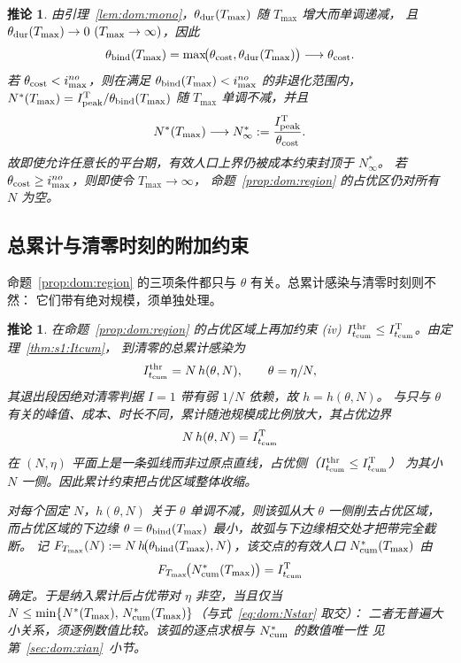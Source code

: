 \documentclass[lang=cn,a4paper,newtx]{elegantpaper}
\numberwithin{equation}{section}
\theoremstyle{plain}
\newtheorem{corollaryn}[theorem]{推论}
\newcommand{\Itcum}{I_{t_{\mathrm{cum}}}}
\begin{document}
\begin{corollaryn}\label{cor:ceiling}
由引理~\ref{lem:dom:mono}，$\theta_{\rm dur}(T_{\max})$ 随 $T_{\max}$ 增大而单调递减，
且 $\theta_{\rm dur}(T_{\max})\to0\ (T_{\max}\to\infty)$，因此
\[
  \theta_{\rm bind}(T_{\max})
  =
  \max\!\bigl(
    \theta_{\rm cost},
    \theta_{\rm dur}(T_{\max})
  \bigr)
  \longrightarrow
  \theta_{\rm cost}.
\]
若 $\theta_{\rm cost}<i_{\max}^{no}$，则在满足 $\theta_{\rm bind}(T_{\max})<i_{\max}^{no}$
的非退化范围内，$N^\ast(T_{\max})=I_{\rm peak}^{\rm T}/\theta_{\rm bind}(T_{\max})$
随 $T_{\max}$ 单调不减，并且
\[
  N^\ast(T_{\max})
  \longrightarrow
  N^\ast_\infty
  :=
  \frac{I_{\rm peak}^{\rm T}}
       {\theta_{\rm cost}}.
\]
故即使允许任意长的平台期，有效人口上界仍被成本约束封顶于 $N^\ast_\infty$。
若 $\theta_{\rm cost}\ge i_{\max}^{no}$，则即使令 $T_{\max}\to\infty$，
命题~\ref{prop:dom:region} 的占优区仍对所有 $N$ 为空。
\end{corollaryn}

\subsection{总累计与清零时刻的附加约束}
\label{sec:dom:extensive}

命题~\ref{prop:dom:region} 的三项条件都只与 $\theta$ 有关。总累计感染与清零时刻则不然：
它们带有绝对规模，须单独处理。

\begin{corollaryn}\label{cor:cum}
在命题~\ref{prop:dom:region} 的占优区域上再加约束
\emph{(iv)} $\Itcum^{\rm thr}\le\Itcum^{\rm T}$。由定理~\ref{thm:s1:Itcum}，
到清零的总累计感染为
\[
  \Itcum^{\rm thr}=N\,h(\theta,N),\qquad \theta=\eta/N,
\]
其退出段因绝对清零判据 $I=1$ 带有弱 $1/N$ 依赖，故 $h=h(\theta,N)$。
与只与 $\theta$ 有关的峰值、成本、时长不同，累计随池规模成比例放大，其占优边界
\begin{equation}
  N\,h(\theta,N)=\Itcum^{\rm T}
  \label{eq:dom:cum-feasible}
\end{equation}
在 $(N,\eta)$ 平面上是一条\emph{弧线}而非过原点直线，占优侧（$\Itcum^{\rm thr}\le\Itcum^{\rm T}$）
为其小 $N$ 一侧。因此累计约束把占优区域整体收缩。

对每个固定 $N$，$h(\theta,N)$ 关于 $\theta$ 单调不减，则该弧从大 $\theta$ 一侧削去占优区域，
而占优区域的下边缘 $\theta=\theta_{\rm bind}(T_{\max})$ 最小，故弧与下边缘相交处才把带完全截断。
记 $F_{T_{\max}}(N):=N\,h\!\bigl(\theta_{\rm bind}(T_{\max}),N\bigr)$，该交点的有效人口
$N_{\rm cum}^\ast(T_{\max})$ 由
\begin{equation}
  F_{T_{\max}}\!\bigl(N_{\rm cum}^\ast(T_{\max})\bigr)=\Itcum^{\rm T}
  \label{eq:dom:Ncumstar}
\end{equation}
确定。于是纳入累计后占优带对 $\eta$ 非空，当且仅当
$N\le\min\{N^\ast(T_{\max}),\,N_{\rm cum}^\ast(T_{\max})\}$（与式~\eqref{eq:dom:Nstar} 取交）：
二者无普遍大小关系，须逐例数值比较。该弧的逐点求根与 $N_{\rm cum}^\ast$ 的数值唯一性
见第~\ref{sec:dom:xian}~小节。
\end{corollaryn}
\end{document}
